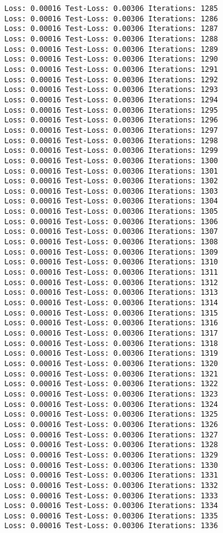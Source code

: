 \documentclass[11pt]{article}
\begin{document}
\begin{Verbatim}[commandchars=\\\{\}]
Loss: 0.00016 Test-Loss: 0.00306 Iterations: 1285
Loss: 0.00016 Test-Loss: 0.00306 Iterations: 1286
Loss: 0.00016 Test-Loss: 0.00306 Iterations: 1287
Loss: 0.00016 Test-Loss: 0.00306 Iterations: 1288
Loss: 0.00016 Test-Loss: 0.00306 Iterations: 1289
Loss: 0.00016 Test-Loss: 0.00306 Iterations: 1290
Loss: 0.00016 Test-Loss: 0.00306 Iterations: 1291
Loss: 0.00016 Test-Loss: 0.00306 Iterations: 1292
Loss: 0.00016 Test-Loss: 0.00306 Iterations: 1293
Loss: 0.00016 Test-Loss: 0.00306 Iterations: 1294
Loss: 0.00016 Test-Loss: 0.00306 Iterations: 1295
Loss: 0.00016 Test-Loss: 0.00306 Iterations: 1296
Loss: 0.00016 Test-Loss: 0.00306 Iterations: 1297
Loss: 0.00016 Test-Loss: 0.00306 Iterations: 1298
Loss: 0.00016 Test-Loss: 0.00306 Iterations: 1299
Loss: 0.00016 Test-Loss: 0.00306 Iterations: 1300
Loss: 0.00016 Test-Loss: 0.00306 Iterations: 1301
Loss: 0.00016 Test-Loss: 0.00306 Iterations: 1302
Loss: 0.00016 Test-Loss: 0.00306 Iterations: 1303
Loss: 0.00016 Test-Loss: 0.00306 Iterations: 1304
Loss: 0.00016 Test-Loss: 0.00306 Iterations: 1305
Loss: 0.00016 Test-Loss: 0.00306 Iterations: 1306
Loss: 0.00016 Test-Loss: 0.00306 Iterations: 1307
Loss: 0.00016 Test-Loss: 0.00306 Iterations: 1308
Loss: 0.00016 Test-Loss: 0.00306 Iterations: 1309
Loss: 0.00016 Test-Loss: 0.00306 Iterations: 1310
Loss: 0.00016 Test-Loss: 0.00306 Iterations: 1311
Loss: 0.00016 Test-Loss: 0.00306 Iterations: 1312
Loss: 0.00016 Test-Loss: 0.00306 Iterations: 1313
Loss: 0.00016 Test-Loss: 0.00306 Iterations: 1314
Loss: 0.00016 Test-Loss: 0.00306 Iterations: 1315
Loss: 0.00016 Test-Loss: 0.00306 Iterations: 1316
Loss: 0.00016 Test-Loss: 0.00306 Iterations: 1317
Loss: 0.00016 Test-Loss: 0.00306 Iterations: 1318
Loss: 0.00016 Test-Loss: 0.00306 Iterations: 1319
Loss: 0.00016 Test-Loss: 0.00306 Iterations: 1320
Loss: 0.00016 Test-Loss: 0.00306 Iterations: 1321
Loss: 0.00016 Test-Loss: 0.00306 Iterations: 1322
Loss: 0.00016 Test-Loss: 0.00306 Iterations: 1323
Loss: 0.00016 Test-Loss: 0.00306 Iterations: 1324
Loss: 0.00016 Test-Loss: 0.00306 Iterations: 1325
Loss: 0.00016 Test-Loss: 0.00306 Iterations: 1326
Loss: 0.00016 Test-Loss: 0.00306 Iterations: 1327
Loss: 0.00016 Test-Loss: 0.00306 Iterations: 1328
Loss: 0.00016 Test-Loss: 0.00306 Iterations: 1329
Loss: 0.00016 Test-Loss: 0.00306 Iterations: 1330
Loss: 0.00016 Test-Loss: 0.00306 Iterations: 1331
Loss: 0.00016 Test-Loss: 0.00306 Iterations: 1332
Loss: 0.00016 Test-Loss: 0.00306 Iterations: 1333
Loss: 0.00016 Test-Loss: 0.00306 Iterations: 1334
Loss: 0.00016 Test-Loss: 0.00306 Iterations: 1335
Loss: 0.00016 Test-Loss: 0.00306 Iterations: 1336

\end{Verbatim}
\end{document}
